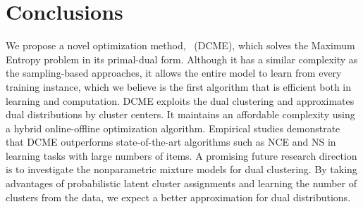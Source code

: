 \section{Conclusions}\label{sec::dcme_conclusion}

We propose a novel optimization method, \DCME{}~(DCME), which solves the Maximum
Entropy problem in its primal-dual form. Although it has a similar complexity as
the sampling-based approaches, it allows the entire model to learn from every
training instance, which we believe is the first algorithm that is efficient
both in learning and computation. DCME exploits the dual clustering and
approximates dual distributions by cluster centers. It maintains an affordable
complexity using a hybrid online-offline optimization algorithm. Empirical
studies demonstrate that DCME outperforms state-of-the-art algorithms such as
NCE and NS in learning tasks with large numbers of items. A promising future
research direction is to investigate the nonparametric mixture models for dual
clustering. By taking advantages of probabilistic latent cluster assignments and
learning the number of clusters from the data, we expect a better approximation
for dual distributions.
